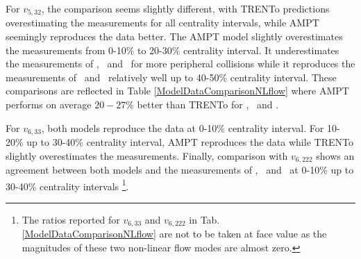 







For $v_{5,32}$, the comparison seems slightly different, with TRENTo predictions overestimating the measurements for all centrality intervals, while AMPT seemingly reproduces the data better. The AMPT model slightly overestimates the measurements from 0-10\% to 20-30\% centrality interval. It underestimates the measurements of \pion, \kaon~and \proton~for more peripheral collisions while it reproduces the measurements of \Ks~and \lambdas~relatively well up to 40-50\% centrality interval. These comparisons are reflected in Table \ref{ModelDataComparisonNLflow} where AMPT performs on average $20-27\%$ better than TRENTo for \pion, \kaon~and \proton. 

For $v_{6,33}$, both models reproduce the data at 0-10\% centrality interval. For 10-20\% up to 30-40\% centrality interval, AMPT reproduces the data while TRENTo slightly overestimates the measurements. Finally, comparison with $v_{6,222}$ shows an agreement between both models and the measurements of \pion, \kaon~and \proton~at 0-10\% up to 30-40\% centrality intervals  \footnote{The ratios reported for $v_{6,33}$ and $v_{6,222}$ in Tab. \ref{ModelDataComparisonNLflow} are not to be taken at face value as the magnitudes of these two non-linear flow modes are almost zero.}. 


